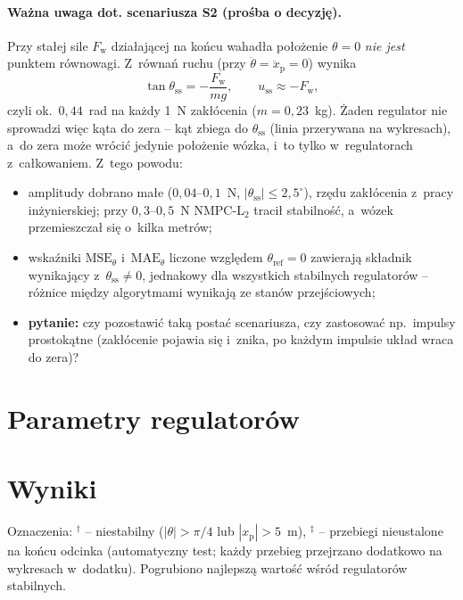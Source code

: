 \documentclass[a4paper,10pt]{article}
\begin{document}
\paragraph{Ważna uwaga dot. scenariusza S2 (prośba o decyzję).}
Przy stałej sile $F_\mathrm{w}$ działającej na końcu wahadła położenie $\theta=0$ \emph{nie jest}
punktem równowagi. Z~równań ruchu (przy $\ddot\theta=\ddot x_\mathrm{p}=0$) wynika
\begin{equation}
\tan\theta_\mathrm{ss}=-\frac{F_\mathrm{w}}{mg},\qquad u_\mathrm{ss}\approx -F_\mathrm{w},
\end{equation}
czyli ok.~$0{,}44$~rad na każdy 1~N zakłócenia ($m=0{,}23$~kg). Żaden regulator nie sprowadzi
więc kąta do zera -- kąt zbiega do $\theta_\mathrm{ss}$ (linia przerywana na wykresach), a~do
zera może wrócić jedynie położenie wózka, i~to tylko w~regulatorach z~całkowaniem. Z~tego powodu:
\begin{itemize}
\item amplitudy dobrano małe ($0{,}04$--$0{,}1$~N, $|\theta_\mathrm{ss}|\le 2{,}5^\circ$), rzędu
zakłócenia z~pracy inżynierskiej; przy $0{,}3$--$0{,}5$~N NMPC-L$_2$ tracił stabilność, a~wózek
przemieszczał się o~kilka metrów;
\item wskaźniki $\mathrm{MSE}_\theta$ i~$\mathrm{MAE}_\theta$ liczone względem $\theta_\mathrm{ref}=0$
zawierają składnik wynikający z~$\theta_\mathrm{ss}\neq0$, jednakowy dla wszystkich stabilnych
regulatorów -- różnice między algorytmami wynikają ze stanów przejściowych;
\item \textbf{pytanie:} czy pozostawić taką postać scenariusza, czy zastosować np.~impulsy
prostokątne (zakłócenie pojawia się i~znika, po każdym impulsie układ wraca do zera)?
\end{itemize}

\section{Parametry regulatorów}
\begin{table}[H]\centering\small
\caption{Parametry wszystkich regulatorów (takie same w~obu scenariuszach).}

\end{table}

\section{Wyniki}
Oznaczenia: $^{\dagger}$ -- niestabilny ($|\theta|>\pi/4$ lub $|x_\mathrm{p}|>5$~m),
$^{\ddagger}$ -- przebiegi nieustalone na końcu odcinka (automatyczny test; każdy przebieg
przejrzano dodatkowo na wykresach w~dodatku). Pogrubiono najlepszą wartość wśród regulatorów
stabilnych.
\end{document}
